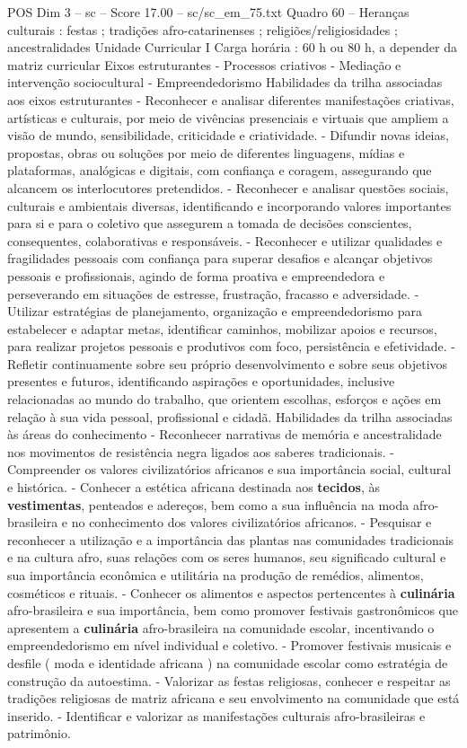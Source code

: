 \begin{textsample}{POS Dim 3 – sc – Score 17.00 – sc/sc\_em\_75.txt}
Quadro 60 – Heranças culturais : festas ; tradições afro-catarinenses ; religiões/religiosidades ; ancestralidades Unidade Curricular I Carga horária : 60 h ou 80 h, a depender da matriz curricular Eixos estruturantes - Processos criativos - Mediação e intervenção sociocultural - Empreendedorismo Habilidades da trilha associadas aos eixos estruturantes - Reconhecer e analisar diferentes manifestações criativas, artísticas e culturais, por meio de vivências presenciais e virtuais que ampliem a visão de mundo, sensibilidade, criticidade e criatividade. - Difundir novas ideias, propostas, obras ou soluções por meio de diferentes linguagens, mídias e plataformas, analógicas e digitais, com confiança e coragem, assegurando que alcancem os interlocutores pretendidos. - Reconhecer e analisar questões sociais, culturais e ambientais diversas, identificando e incorporando valores importantes para si e para o coletivo que assegurem a tomada de decisões conscientes, consequentes, colaborativas e responsáveis. - Reconhecer e utilizar qualidades e fragilidades pessoais com confiança para superar desafios e alcançar objetivos pessoais e profissionais, agindo de forma proativa e empreendedora e perseverando em situações de estresse, frustração, fracasso e adversidade. - Utilizar estratégias de planejamento, organização e empreendedorismo para estabelecer e adaptar metas, identificar caminhos, mobilizar apoios e recursos, para realizar projetos pessoais e produtivos com foco, persistência e efetividade. - Refletir continuamente sobre seu próprio desenvolvimento e sobre seus objetivos presentes e futuros, identificando aspirações e oportunidades, inclusive relacionadas ao mundo do trabalho, que orientem escolhas, esforços e ações em relação à sua vida pessoal, profissional e cidadã.
Habilidades da trilha associadas às áreas do conhecimento - Reconhecer narrativas de memória e ancestralidade nos movimentos de resistência negra ligados aos saberes tradicionais. - Compreender os valores civilizatórios africanos e sua importância social, cultural e histórica. - Conhecer a estética africana destinada aos \textbf{tecidos}, às \textbf{vestimentas}, penteados e adereços, bem como a sua influência na moda afro-brasileira e no conhecimento dos valores civilizatórios africanos. - Pesquisar e reconhecer a utilização e a importância das plantas nas comunidades tradicionais e na cultura afro, suas relações com os seres humanos, seu significado cultural e sua importância econômica e utilitária na produção de remédios, alimentos, cosméticos e rituais. - Conhecer os alimentos e aspectos pertencentes à \textbf{culinária} afro-brasileira e sua importância, bem como promover festivais gastronômicos que apresentem a \textbf{culinária} afro-brasileira na comunidade escolar, incentivando o empreendedorismo em nível individual e coletivo. - Promover festivais musicais e desfile ( moda e identidade africana ) na comunidade escolar como estratégia de construção da autoestima. - Valorizar as festas religiosas, conhecer e respeitar as tradições religiosas de matriz africana e seu envolvimento na comunidade que está inserido. - Identificar e valorizar as manifestações culturais afro-brasileiras e patrimônio.

\end{textsample}
